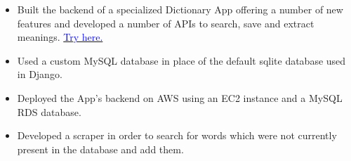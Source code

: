 \documentclass[11pt,b4paper,ragged2e]{altacv}
\begin{document}

\begin{itemize}
    \item Built the backend of a specialized Dictionary App offering a number of new features and developed a number of APIs to search, save and extract meanings. \href{http://wordonary.co.in/}{\textcolor{blue}{Try here.}}
    \item Used a custom MySQL database in place of the default sqlite database used in Django.
    \item Deployed the App's backend on AWS using an EC2 instance and a MySQL RDS database.
    \item Developed a scraper in order to search for words which were not currently present in the database and add them.
\end{itemize}
\end{document}
